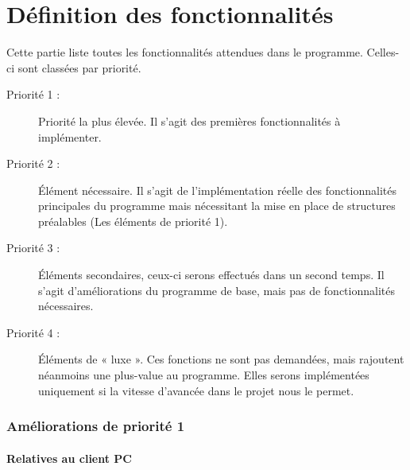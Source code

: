 \part{Définition des fonctionnalités}
Cette partie liste toutes les fonctionnalités attendues dans le programme. Celles-ci sont classées par priorité.

\begin{description}
\item [Priorité 1 :]
	Priorité la plus élevée. Il s'agit des premières fonctionnalités à implémenter.

\item [Priorité 2 :]
	Élément nécessaire. Il s'agit de l'implémentation réelle des fonctionnalités principales du programme mais nécessitant la mise en place de structures préalables (Les éléments de priorité 1). 

\item [Priorité 3 :]
	Éléments secondaires, ceux-ci serons effectués dans un second temps. Il s'agit d'améliorations du programme de base, mais pas de fonctionnalités nécessaires.  

\item [Priorité 4 :]
	Éléments de « luxe ». Ces fonctions ne sont pas demandées, mais rajoutent néanmoins une plus-value au programme. Elles serons implémentées uniquement si la vitesse d'avancée dans le projet nous le permet.
\end{description}


\section{Améliorations de priorité 1}


\subsection{Relatives au client PC}

